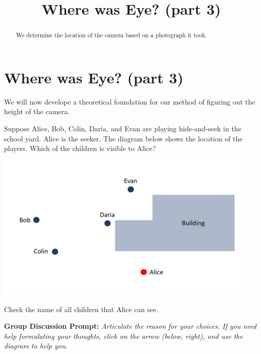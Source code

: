 \documentclass{ximera}
\title{Where was Eye? (part 3)} \license{CC BY-NC-SA 4.0}
\begin{document}
\begin{abstract}
We determine the location of the camera based on a photograph it took.
\end{abstract}
\maketitle

\section*{Where was Eye? (part 3)}


We will now develope a theoretical foundation for our method of figuring out the height of the camera. 

\begin{exploration}\label{exp:hideAndSeek}
Suppose Alice, Bob, Colin, Daria, and Evan are playing hide-and-seek in the school yard.  Alice is the seeker.  The diagram below shows the location of the players.  Which of the children is visible to Alice?
     \begin{image}
         \includegraphics[width=5in]{hideAndSeek1.jpg}
\end{image}
Check the name of all children that Alice can see.
\begin{selectAll}
\end{selectAll}

\textbf{Group Discussion Prompt:}
\emph{Articulate the reason for your choices.  If you need help formulating your thoughts, click on the arrow (below, right), and use the diagram to help you.}


\end{exploration}
\end{document}
